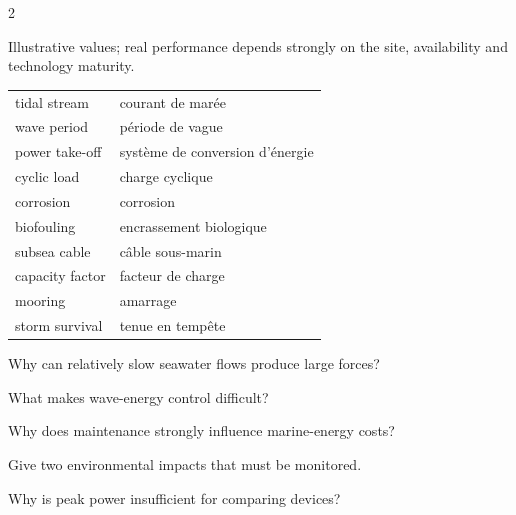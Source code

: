 \begin{multicols}{2}
\begin{tcolorbox}[title=\sffamily\bfseries Illustrative capacity factors,colback=white,colframe=ECBlue]
\begin{center}
\end{center}
\footnotesize Illustrative values; real performance depends strongly on the site, availability and technology maturity.
\end{tcolorbox}

\begin{vocabulary}
\begin{tabularx}{\linewidth}{@{}lX@{}}
tidal stream & courant de marée\\
wave period & période de vague\\
power take-off & système de conversion d'énergie\\
cyclic load & charge cyclique\\
corrosion & corrosion\\
biofouling & encrassement biologique\\
subsea cable & câble sous-marin\\
capacity factor & facteur de charge\\
mooring & amarrage\\
storm survival & tenue en tempête
\end{tabularx}
\end{vocabulary}

\begin{questions}
\item Why can relatively slow seawater flows produce large forces?
\item What makes wave-energy control difficult?
\item Why does maintenance strongly influence marine-energy costs?
\item Give two environmental impacts that must be monitored.
\item Why is peak power insufficient for comparing devices?
\end{questions}


\end{multicols}
